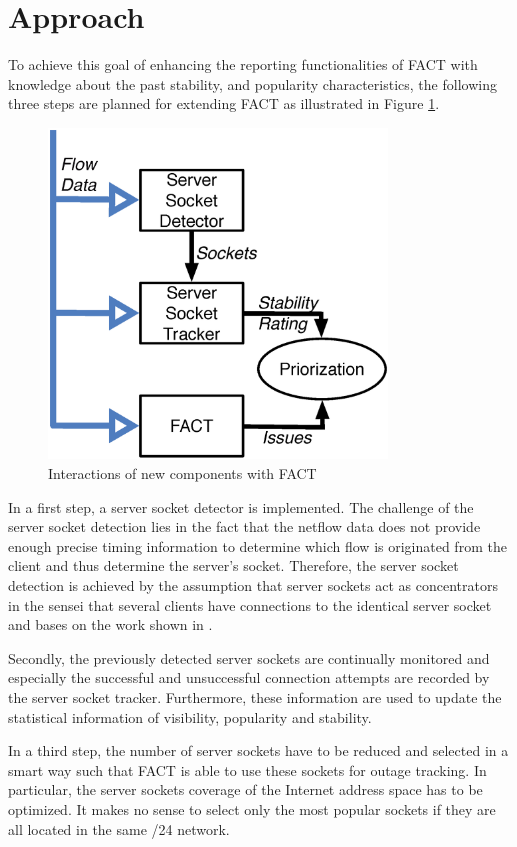 \documentclass{sigcomm-alternate}
\begin{document}
\section{Approach}
To achieve this goal of enhancing the reporting functionalities of FACT
with knowledge about the past stability, and popularity characteristics,
the following three steps are planned for extending FACT 
as illustrated in Figure \ref{fig:FACT}.

\begin{figure}[ht!]
\centering \includegraphics[width=9cm]{images/Approach_blockdiagram.eps}
\caption{Interactions of new components with FACT}
\label{fig:FACT}
\end{figure}


In a first step, a server socket detector is implemented. The
challenge of the server socket detection lies in the fact that the
netflow data does not provide enough precise timing information to
determine which flow is originated from the client and thus determine
the server's socket. Therefore, the server socket detection is
achieved by the assumption that server sockets act as concentrators
in the sensei that several clients have connections to the identical
server socket and bases on the work shown in \cite{Schatzmann:Dissection,Schatzmann:Mining,Schatzmann:Tracing}.

Secondly, the previously detected server sockets are continually
monitored and especially the successful and unsuccessful connection
attempts are recorded by the server socket tracker. 
Furthermore, these information are used to update the statistical 
information of visibility, popularity and stability.

In a third step, the number of server sockets have to be reduced and
selected in a smart way such that FACT is able to use these sockets
for outage tracking. In particular, the server sockets coverage of the
Internet address space has to be optimized. It makes no sense to select
only the most popular sockets if they are all located in the same /24
network.
\end{document}
